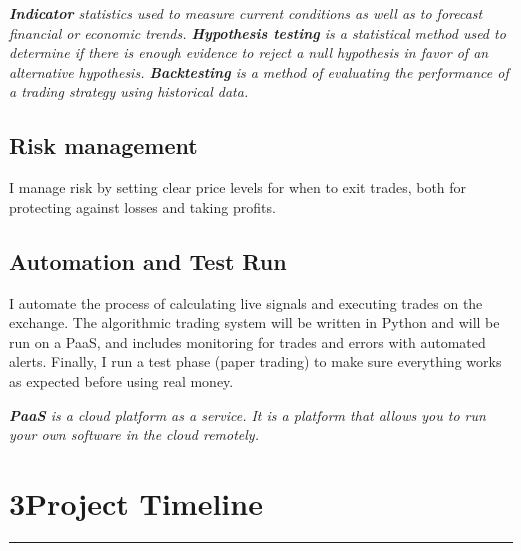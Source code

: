 \documentclass[12pt,a4paper]{article}
\begin{document}





\vspace{0.5em}
\noindent\textit{\footnotesize%
\textbf{Indicator} statistics used to measure current conditions as well as to forecast financial or economic trends. \textbf{Hypothesis testing} is a  statistical method used to determine if there is enough evidence to reject a null hypothesis in favor of an alternative hypothesis. \textbf{Backtesting} is a method of evaluating the performance of a trading strategy using historical data.
}







\subsection{Risk management}
I manage risk by setting clear price levels for when to exit trades, both for protecting against losses and taking profits. 




\newpage

\subsection{Automation and Test Run}


I automate the process of calculating live signals and executing trades on the exchange. The algorithmic trading system will be written in Python and will be run on a PaaS, and includes monitoring for trades and errors with automated alerts. Finally, I run a test phase (paper trading) to make sure everything works as expected before using real money.

\vspace{0.5em}
\noindent\textit{\footnotesize%
\textbf{PaaS} is a cloud platform as a service. It is a platform that allows you to run your own software in the cloud remotely.}


\section*{3\hspace{1em}Project Timeline}
\vspace{-0.5em}
\noindent\rule{\textwidth}{0.5pt}
\end{document}
